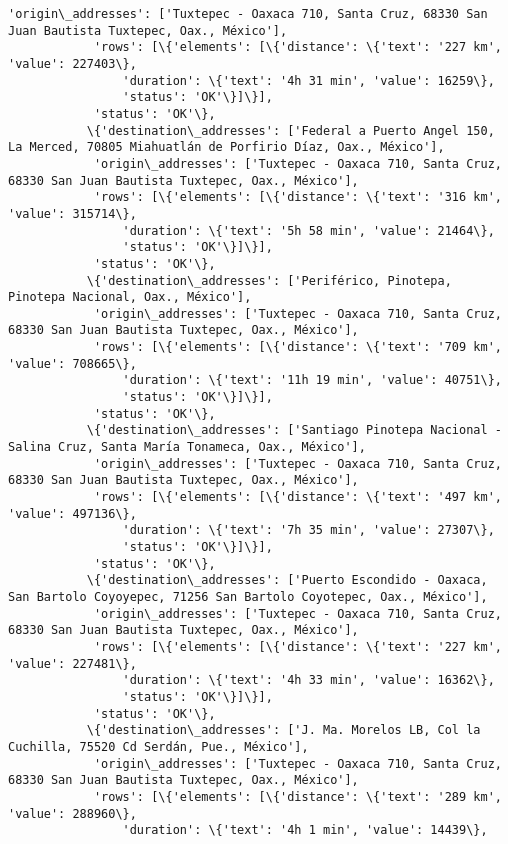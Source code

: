 \documentclass[11pt]{article}
\begin{document}
\begin{Verbatim}[commandchars=\\\{\}]
            'origin\_addresses': ['Tuxtepec - Oaxaca 710, Santa Cruz, 68330 San Juan Bautista Tuxtepec, Oax., México'],
            'rows': [\{'elements': [\{'distance': \{'text': '227 km', 'value': 227403\},
                'duration': \{'text': '4h 31 min', 'value': 16259\},
                'status': 'OK'\}]\}],
            'status': 'OK'\},
           \{'destination\_addresses': ['Federal a Puerto Angel 150, La Merced, 70805 Miahuatlán de Porfirio Díaz, Oax., México'],
            'origin\_addresses': ['Tuxtepec - Oaxaca 710, Santa Cruz, 68330 San Juan Bautista Tuxtepec, Oax., México'],
            'rows': [\{'elements': [\{'distance': \{'text': '316 km', 'value': 315714\},
                'duration': \{'text': '5h 58 min', 'value': 21464\},
                'status': 'OK'\}]\}],
            'status': 'OK'\},
           \{'destination\_addresses': ['Periférico, Pinotepa, Pinotepa Nacional, Oax., México'],
            'origin\_addresses': ['Tuxtepec - Oaxaca 710, Santa Cruz, 68330 San Juan Bautista Tuxtepec, Oax., México'],
            'rows': [\{'elements': [\{'distance': \{'text': '709 km', 'value': 708665\},
                'duration': \{'text': '11h 19 min', 'value': 40751\},
                'status': 'OK'\}]\}],
            'status': 'OK'\},
           \{'destination\_addresses': ['Santiago Pinotepa Nacional - Salina Cruz, Santa María Tonameca, Oax., México'],
            'origin\_addresses': ['Tuxtepec - Oaxaca 710, Santa Cruz, 68330 San Juan Bautista Tuxtepec, Oax., México'],
            'rows': [\{'elements': [\{'distance': \{'text': '497 km', 'value': 497136\},
                'duration': \{'text': '7h 35 min', 'value': 27307\},
                'status': 'OK'\}]\}],
            'status': 'OK'\},
           \{'destination\_addresses': ['Puerto Escondido - Oaxaca, San Bartolo Coyoyepec, 71256 San Bartolo Coyotepec, Oax., México'],
            'origin\_addresses': ['Tuxtepec - Oaxaca 710, Santa Cruz, 68330 San Juan Bautista Tuxtepec, Oax., México'],
            'rows': [\{'elements': [\{'distance': \{'text': '227 km', 'value': 227481\},
                'duration': \{'text': '4h 33 min', 'value': 16362\},
                'status': 'OK'\}]\}],
            'status': 'OK'\},
           \{'destination\_addresses': ['J. Ma. Morelos LB, Col la Cuchilla, 75520 Cd Serdán, Pue., México'],
            'origin\_addresses': ['Tuxtepec - Oaxaca 710, Santa Cruz, 68330 San Juan Bautista Tuxtepec, Oax., México'],
            'rows': [\{'elements': [\{'distance': \{'text': '289 km', 'value': 288960\},
                'duration': \{'text': '4h 1 min', 'value': 14439\},

\end{Verbatim}
\end{document}
